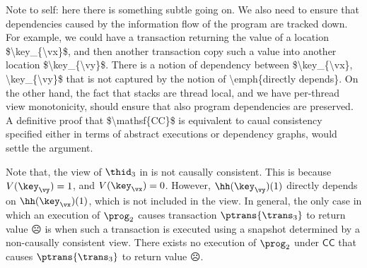 \ac{Note to self: here there is something subtle going on. We also need to ensure that dependencies 
caused by the information flow of the program are tracked down. For example, we could have a 
transaction returning the value of a location $\key_{\vx}$, and then another transaction copy such a value 
into another location $\key_{\vy}$. There is a notion of dependency between $\key_{\vx}, \key_{\vy}$ that 
is not captured by the notion of \emph{directly depends}. On the other hand, the fact that 
stacks are thread local, and we have per-thread view monotonicity, should ensure that also program 
dependencies are preserved. A definitive proof that $\mathsf{CC}$ is equivalent to caual consistency 
specified either in terms of abstract executions or dependency graphs, would settle the argument.}

Note that, the view of $\thid_3$ in  is not causally consistent.
This is because $V(\key_{\vy}) = 1$, and $V(\key_{\vx}) = 0$. However, $\hh(\key_{\vy})(1)$ directly depends 
on $\hh(\key_{\vx})(1)$, which is not included in the view. 
In general, the only case in which an execution of $\prog_2$ causes transaction $\ptrans{\trans_3}$ to return value $\sadface$ is when such a transaction is executed using a snapshot determined by a non-causally consistent view. 
There exists no execution of $\prog_2$ under $\mathsf{CC}$ that causes $\ptrans{\trans_3}$ to return value $\sadface$.


%
